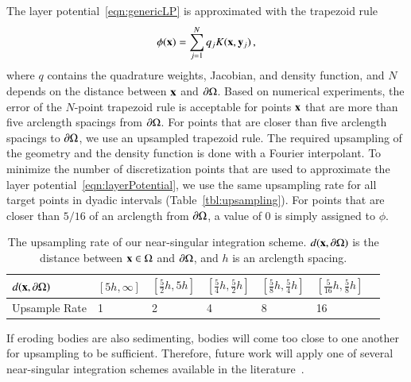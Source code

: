 \documentclass[preprint, 10pt]{elsarticle}
\begin{document}
The layer potential~\eqref{eqn:genericLP} is approximated with the trapezoid rule 
\begin{align}
  \phi({\mathbf{x}}) = \sum_{j=1}^N q_j K({\mathbf{x}},{\mathbf{y}}_j)\, ,
  \label{eqn:layerPotential}
\end{align}
where $q$ contains the quadrature weights, Jacobian, and density function, and $N$ depends on the distance between ${\mathbf{x}}$ and ${\partial}\Omega$.  Based on numerical experiments, the error of the $N$-point trapezoid rule is acceptable for points ${\mathbf{x}}$ that are more than five arclength spacings from ${\partial}\Omega$. For points that are closer than five arclength spacings to ${\partial}\Omega$, we use an upsampled trapezoid rule.  The required upsampling of the geometry and the density function is done with a Fourier interpolant.  To minimize the number of discretization points that are used to approximate the layer potential~\eqref{eqn:layerPotential}, we use the same upsampling rate for all target points in dyadic intervals (Table~\ref{tbl:upsampling}).  For points that are closer than $5/16$ of an arclength from ${\partial}\Omega$, a value of 0 is simply assigned to $\phi$.
\begin{table}[htpb]
\begin{center}
\caption{\label{tbl:upsampling}The upsampling rate of our near-singular integration scheme.  $d({\mathbf{x}},{\partial}\Omega)$ is the distance between ${\mathbf{x}} \in \Omega$ and ${\partial}\Omega$, and $h$ is an arclength spacing.}
\vspace{0.3 pc}
\label{table:arangle}
\begin{tabular}{|V|V|V|V|V|V|N}
  \hline
  $d({\mathbf{x}},{\partial}\Omega)$ &
  $\left[5h,\infty\right]$ &
  $\left[\frac{5}{2}h,5h\right]$ &
  $\left[\frac{5}{4}h,\frac{5}{2}h\right]$ & 
  $\left[\frac{5}{8}h,\frac{5}{4}h\right]$ &
  $\left[\frac{5}{16}h,\frac{5}{8}h\right]$ & \\ [2ex] 
  \hline
  Upsample Rate & 1 & 2 & 4 & 8 & 16 & \\
  \hline
\end{tabular}
\end{center}
\end{table}

If eroding bodies are also sedimenting, bodies will come too close to one another for upsampling to be sufficient.  Therefore, future work will apply one of several near-singular integration schemes available in the literature~\cite{qua-bir2014a, klo-bar-gre-one2013, bar-wu-vee2015, hel-oja2008a}.
\end{document}
